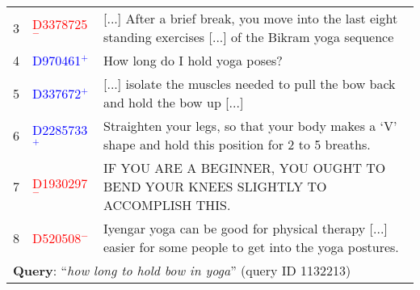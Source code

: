 \documentclass{standalone}
\begin{document}
\begin{tabularx}{27cm}{rll}
    \num{3}       & \textcolor{red}{D3378725$^{-}$}  & [...] After a brief break, you move into the last eight standing exercises [...] of the Bikram yoga sequence \\
    \num{4}       & \textcolor{blue}{D970461$^{+}$}  & How long do I hold yoga poses?                                                                               \\
    \num{5}       & \textcolor{blue}{D337672$^{+}$}  & [...] isolate the muscles needed to pull the bow back and hold the bow up [...]                              \\
    \num{6}       & \textcolor{blue}{D2285733$^{+}$} & Straighten your legs, so that your body makes a ‘V’ shape and hold this position for 2 to 5 breaths.         \\
    \num{7}       & \textcolor{red}{D1930297$^{-}$}  & IF YOU ARE A BEGINNER, YOU OUGHT TO BEND YOUR KNEES SLIGHTLY TO ACCOMPLISH THIS.                             \\
    \num{8}       & \textcolor{red}{D520508$^{-}$}   & Iyengar yoga can be good for physical therapy [...] easier for some people to get into the yoga postures.    \\
    \midrule
    \multicolumn{3}{l}{\textbf{Query}: ``\textit{how long to hold bow in yoga}'' (query ID 1132213)}                                                                \\
    \bottomrule
\end{tabularx}
\end{document}

